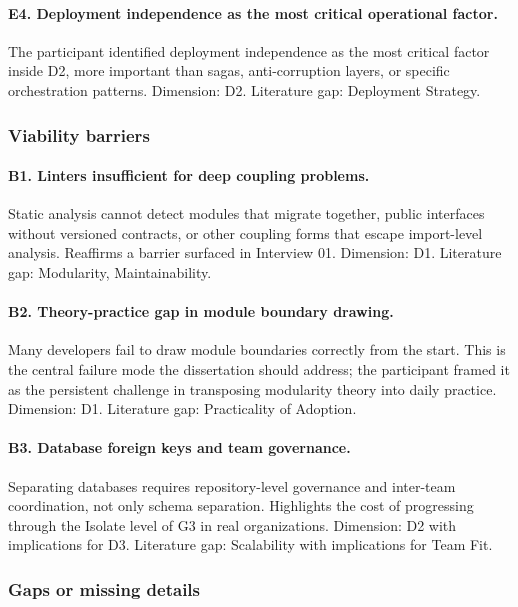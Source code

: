 \paragraph*{E4. Deployment independence as the most critical operational factor.} The participant identified deployment independence as the most critical factor inside D2, more important than sagas, anti-corruption layers, or specific orchestration patterns. Dimension: D2. Literature gap: Deployment Strategy.

\subsubsection*{Viability barriers}

\paragraph*{B1. Linters insufficient for deep coupling problems.} Static analysis cannot detect modules that migrate together, public interfaces without versioned contracts, or other coupling forms that escape import-level analysis. Reaffirms a barrier surfaced in Interview 01. Dimension: D1. Literature gap: Modularity, Maintainability.

\paragraph*{B2. Theory-practice gap in module boundary drawing.} Many developers fail to draw module boundaries correctly from the start. This is the central failure mode the dissertation should address; the participant framed it as the persistent challenge in transposing modularity theory into daily practice. Dimension: D1. Literature gap: Practicality of Adoption.

\paragraph*{B3. Database foreign keys and team governance.} Separating databases requires repository-level governance and inter-team coordination, not only schema separation. Highlights the cost of progressing through the Isolate level of G3 in real organizations. Dimension: D2 with implications for D3. Literature gap: Scalability with implications for Team Fit.

\subsubsection*{Gaps or missing details}

